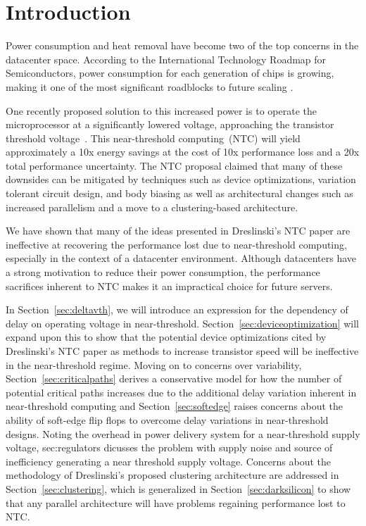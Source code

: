 \section{Introduction}
\label{sec:intro}

Power consumption and heat removal have become two of the top concerns in the datacenter space\cite{EPA_2007}. 
According to the International Technology Roadmap for Semiconductors, power consumption for each generation of chips is growing, making it one of the most significant roadblocks to future scaling \cite{Devised_2009}. 

One recently proposed  solution to this increased power is to operate the microprocessor at a significantly lowered voltage, approaching the transistor threshold voltage~\cite{Dreslinski:2010ez}. 
This near-threshold computing~(NTC) will yield approximately a 10x energy savings at the cost of 10x performance loss and a 20x total performance uncertainty. 
The NTC proposal claimed that many of these downsides can be mitigated by techniques such as device optimizations, variation tolerant circuit design, and body biasing as well as architectural changes such as increased parallelism and a move to a clustering-based architecture.

We have shown that many of the ideas presented in Dreslinski's NTC paper \cite{Dreslinski:2010ez} are ineffective at recovering the performance lost due to near-threshold computing, especially in the context of a datacenter environment. 
Although datacenters have a strong motivation to reduce their power consumption, the performance sacrifices inherent to NTC makes it an impractical choice for future servers.

In Section~\ref{sec:deltavth}, we will introduce an expression for the dependency of delay on operating voltage in near-threshold.
Section~\ref{sec:deviceoptimization} will expand upon this to show that the potential device optimizations cited by Dreslinski's NTC paper as methods to increase transistor speed will be ineffective in the near-threshold regime.
Moving on to concerns over variability, Section~\ref{sec:criticalpaths} derives a conservative model for how the number of potential critical paths increases due to the additional delay variation inherent in near-threshold computing and Section~\ref{sec:softedge} raises concerns about the ability of soft-edge flip flops to overcome delay variations in near-threshold designs.
Noting the overhead in power delivery system for a near-threshold supply voltage, {sec:regulators} dicusses the problem with supply noise and source of inefficiency generating a near threshold supply voltage. 
Concerns about the methodology of Dreslinski's proposed clustering architecture are addressed in Section~\ref{sec:clustering}, which is generalized in Section~\ref{sec:darksilicon} to show that any parallel architecture will have problems regaining performance lost to NTC.

